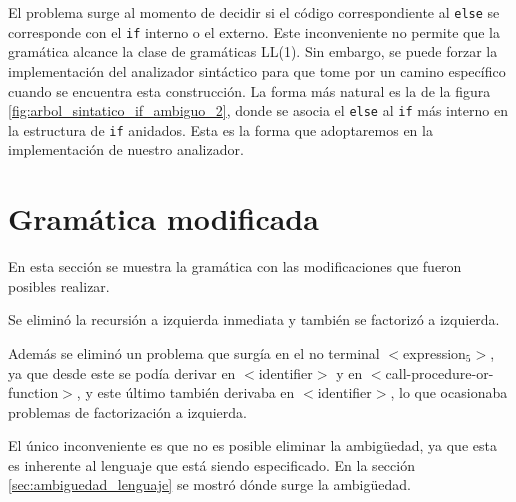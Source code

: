 El problema surge al momento de decidir si el código correspondiente al \texttt{else} se corresponde con el \texttt{if} interno o el externo.
Este inconveniente no permite que la gramática alcance la clase de gramáticas LL(1). Sin embargo, se puede forzar la implementación del analizador sintáctico para que tome por un camino específico cuando se encuentra esta construcción. La forma más natural es la de la figura \ref{fig:arbol_sintatico_if_ambiguo_2}, donde se asocia el \texttt{else} al \texttt{if} más interno en la estructura de \texttt{if} anidados. Esta es la forma que adoptaremos en la implementación de nuestro analizador.

\section{Gramática modificada}
\label{sec:gramatica_mod}
En esta sección se muestra la gramática con las modificaciones que fueron posibles realizar. 

Se eliminó la recursión a izquierda inmediata y también se factorizó a izquierda. 

Además se eliminó un problema que surgía en el no terminal $<$expression$_{5}$$>$, ya que desde este se podía derivar en $<$identifier$>$ y en $<$call-procedure-or-function$>$, y este último también derivaba en $<$identifier$>$, lo que ocasionaba problemas de factorización a izquierda.

El único inconveniente es que no es posible eliminar la ambigüedad, ya que esta es inherente al lenguaje que está siendo especificado. En la sección \ref{sec:ambiguedad_lenguaje} se mostró dónde surge la ambigüedad.
 
